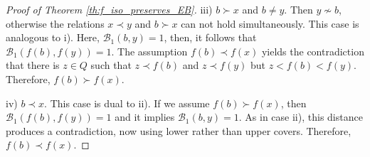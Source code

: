\documentclass{article}[12pt]
\theoremstyle{exampstyle}
\theoremstyle{remark}
\newcommand{\B}{\mathcal{B}}
\begin{document}
\begin{proof}[Proof of Theorem \ref{th:f_iso_preserves_EB}]
     \begin{minipage}{0.81\textwidth}
        iii) $b \succ x$ and $b \neq y$. Then $y \nsim b$, otherwise the relations $x \prec y$ and  $b \succ x$ can not hold  simultaneously. This case is analogous to i). Here, $\B_1(b,y) = 1$, then, it follows that  $\B_1(f(b),f(y)) = 1$. The assumption $f(b) \prec f(x)$ yields the contradiction that there is $z \in Q$ such that $ z \prec f(b) $ and $z \prec f(y)$ but $z < f(b) < f(y) $. Therefore, $f(b) \succ f(x)$.
     \end{minipage}
      \hfill
     \begin{minipage}{0.15\textwidth}
     \end{minipage}
     
     \begin{minipage}{0.81\textwidth}
        iv) $b \prec x$. This case is dual to ii). If we assume $f(b) \succ f(x)$, then $\B_1(f(b),f(y)) = 1$ and it implies $\B_1(b,y) = 1$. As in case ii), this distance produces a contradiction, now using lower rather than upper covers. Therefore, $f(b) \prec f(x)$.
     \end{minipage}
      \hfill
     \begin{minipage}{0.15\textwidth}
     \end{minipage}
     

\end{proof}
\end{document}
